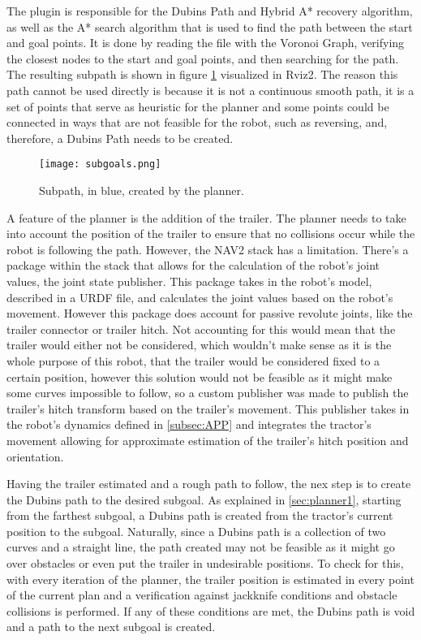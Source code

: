 The plugin is responsible for the Dubins Path and Hybrid A* recovery algorithm, 
as well as the A* search algorithm that is used to find the path between the start and goal points. It is done 
by reading the file with the Voronoi Graph, verifying the closest nodes to the 
start and goal points, and then searching for the path. The resulting subpath is 
shown in figure \ref{fig:subgoals} visualized in Rviz2.
The reason this path cannot be used directly is because it is not a continuous 
smooth path, it is a set of points that serve as heuristic for the planner and 
some points could be connected in ways that are not feasible for the robot, such as reversing, and, therefore, 
a Dubins Path needs to be created.
\begin{figure}[h]
    \centering
    \texttt{[image: subgoals.png]}
    \caption{Subpath, in blue, created by the planner.}
    \label{fig:subgoals}
\end{figure}

A feature of the planner is the addition of the trailer. The planner needs to take into account 
the position of the trailer to ensure that no collisions occur while the robot is 
following the path. However, the \gls{NAV2} stack has a limitation. There's a package 
within the stack that allows for the calculation of the robot's joint values, the joint state 
publisher. This package takes in the robot's model, described in a \gls{URDF} file, and calculates the joint values 
based on the robot's movement. However this package does account for passive revolute joints, like 
the trailer connector or trailer hitch. Not accounting for this would mean 
that the trailer would either not be considered, which wouldn't make sense 
as it is the whole purpose of this robot, that the trailer would be considered 
fixed to a certain position, however this solution would not be feasible as it might make 
some curves impossible to follow, so a custom publisher was made to publish the trailer's hitch 
transform based on the trailer's movement. This publisher takes in the robot's 
dynamics defined in \ref{subsec:APP} and integrates the tractor's movement 
allowing for approximate estimation of the trailer's hitch position and orientation.


Having the trailer estimated and a rough path to follow, the nex step is to create the 
Dubins path to the desired subgoal. As explained in \ref{sec:planner1}, starting from the farthest subgoal, 
a Dubins path is created from the tractor's current position to the subgoal. Naturally, since a Dubins 
path is a collection of two curves and a straight line, the path created may not be feasible as it might 
go over obstacles or even put the trailer in undesirable positions. To check for this, with every iteration 
of the planner, the trailer position is estimated in every point of the current plan and a verification 
against jackknife conditions and obstacle collisions is performed. If any of these conditions 
are met, the Dubins path is void and a path to the next subgoal is created.

